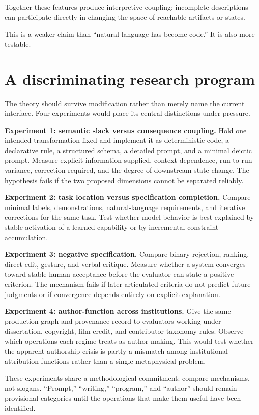 \documentclass[11pt]{article}
\begin{document}
Together these features produce interpretive coupling: incomplete descriptions can participate directly in changing the space of reachable artifacts or states.

This is a weaker claim than ``natural language has become code.'' It is also more testable.

\section{A discriminating research program}

The theory should survive modification rather than merely name the current interface. Four experiments would place its central distinctions under pressure.

\textbf{Experiment 1: semantic slack versus consequence coupling.} Hold one intended transformation fixed and implement it as deterministic code, a declarative rule, a structured schema, a detailed prompt, and a minimal deictic prompt. Measure explicit information supplied, context dependence, run-to-run variance, correction required, and the degree of downstream state change. The hypothesis fails if the two proposed dimensions cannot be separated reliably.

\textbf{Experiment 2: task location versus specification completion.} Compare minimal labels, demonstrations, natural-language requirements, and iterative corrections for the same task. Test whether model behavior is best explained by stable activation of a learned capability or by incremental constraint accumulation.

\textbf{Experiment 3: negative specification.} Compare binary rejection, ranking, direct edit, gesture, and verbal critique. Measure whether a system converges toward stable human acceptance before the evaluator can state a positive criterion. The mechanism fails if later articulated criteria do not predict future judgments or if convergence depends entirely on explicit explanation.

\textbf{Experiment 4: author-function across institutions.} Give the same production graph and provenance record to evaluators working under dissertation, copyright, film-credit, and contributor-taxonomy rules. Observe which operations each regime treats as author-making. This would test whether the apparent authorship crisis is partly a mismatch among institutional attribution functions rather than a single metaphysical problem.

These experiments share a methodological commitment: compare mechanisms, not slogans. ``Prompt,'' ``writing,'' ``program,'' and ``author'' should remain provisional categories until the operations that make them useful have been identified.
\end{document}
